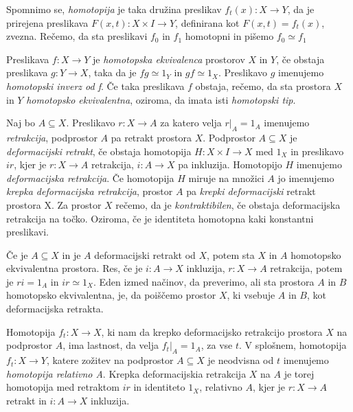 \documentclass[mat1]{fmfdelo}
\begin{document}
Spomnimo se, \textit{homotopija} je taka družina preslikav $f_t(x):X \rightarrow Y$, da je prirejena preslikava $F(x,t):X \times I \rightarrow Y$, definirana kot $F(x,t)=f_t(x)$, zvezna. Rečemo, da sta preslikavi $f_0$ in $f_1$ homotopni in pišemo $f_0 \simeq f_1$


\begin{definicija}
    Preslikava  $f : X \rightarrow Y$ je \textit{homotopska ekvivalenca} prostorov $X$ in $Y$, če obstaja preslikava $g: Y\rightarrow X$, taka da
    je $f g \simeq 1_Y$ in $gf \simeq 1_X$. Preslikavo $g$ imenujemo \textit{homotopski inverz od f}. Če taka preslikava $f$ obstaja, rečemo, da sta prostora $X$ in
    $Y$  \textit{homotopsko ekvivalentna}, oziroma, da imata isti \textit{homotopski tip}.
\end{definicija}

\begin{definicija}
    Naj bo $A \subseteq X$. Preslikavo $r : X \rightarrow A$ za katero 
    velja $r|_A = 1_A$ imenujemo \textit{retrakcija}, podprostor
     $A$ pa retrakt prostora $X$. Podprostor $A \subseteq X$ je 
     \textit{deformacijski retrakt}, če obstaja homotopija $H : X \times
      I \rightarrow X$ med $1_X$ in preslikavo $ir$, kjer je $r : X 
      \rightarrow A$ retrakcija, $i:A\rightarrow X$ pa inkluzija. Homotopijo $H$ imenujemo \textit{deformacijska 
      retrakcija}. Če homotopija $H$ miruje na množici $A$ jo imenujemo 
      \textit{krepka deformacijska retrakcija}, prostor $A$ pa 
      \textit{krepki deformacijski} retrakt prostora X. Za prostor $X$ rečemo, da je \textit{kontraktibilen}, če obstaja deformacijska retrakcija na točko. Oziroma, če je identiteta homotopna kaki konstantni preslikavi.
\end{definicija}

Če je $A\subseteq X$ in je $A$ deformacijski retrakt od $X$, potem sta 
$X$ in $A$ homotopsko ekvivalentna prostora. Res, če je $i:A\rightarrow
 X$ inkluzija, $r:X\rightarrow A$ retrakcija, potem je $ri=1_A$
  in $ir\simeq1_X$. Eden izmed načinov, da preverimo, ali sta
   prostora $A$ in $B$ homotopsko ekvivalentna, je, da poiščemo prostor
    $X$, ki vsebuje $A$ in $B$, kot deformacijska retrakta. 

Homotopija $f_t: X\rightarrow X$, ki nam da krepko deformacijsko retrakcijo 
prostora $X$ na podprostor $A$, ima lastnost, da velja 
$f_t|_A=1_A$, za vse $t$. V splošnem, homotopija 
$f_t:X\rightarrow Y$, katere zožitev na podprostor $A\subseteq X$ je 
neodvisna od $t$ imenujemo \textit{homotopija relativno A}. Krepka 
deformacijskia retrakcija $X$ na $A$ je torej homotopija med retraktom
 $ir$ in identiteto $1_X$, relativno $A$, kjer je $r:X\rightarrow A$ retrakt in $i:A\rightarrow X$ inkluzija.
\end{document}
